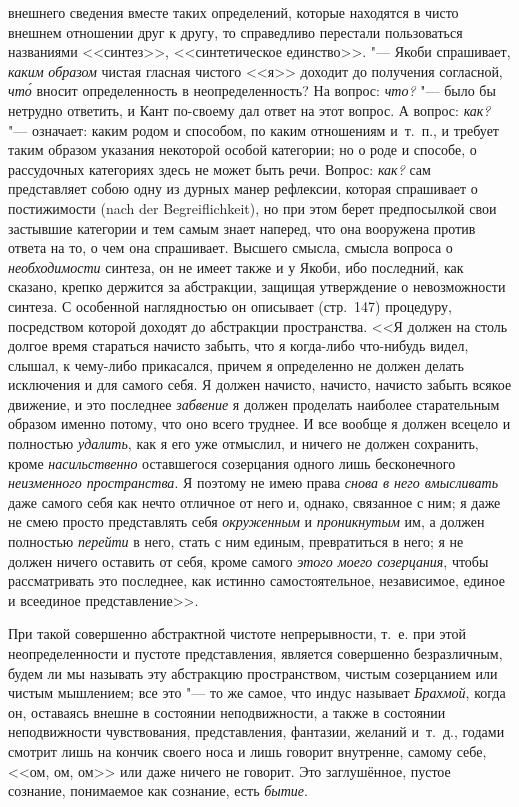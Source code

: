 внешнего сведения вместе таких определений, которые находятся в чисто
внешнем отношении друг к другу, то справедливо перестали пользоваться
названиями <<синтез>>, <<синтетическое единство>>. "--- Якоби спрашивает,
{\em каким} {\em образом} чистая
гласная чистого <<я>> доходит до получения согласной,
{\em чт\'{о}} вносит определенность в неопределенность? На
вопрос: {\em что?} "--- было бы нетрудно ответить, и Кант
по-своему дал ответ на этот вопрос. А вопрос:
{\em как?} "--- означает: каким родом и способом, по каким
отношениям и~т.~п., и требует таким образом указания некоторой особой
категории; но о роде и способе, о рассудочных категориях здесь не может
быть речи. Вопрос: {\em как?} сам представляет собою
одну из дурных манер рефлексии, которая спрашивает о постижимости (nach der
Begreiflichkeit), но при этом берет предпосылкой свои застывшие категории и
тем самым знает наперед, что она вооружена против ответа на то, о чем она
спрашивает. Высшего смысла, смысла вопроса о
{\em необходимости} синтеза, он не имеет также и у
Якоби, ибо последний, как сказано, крепко держится за абстракции, защищая
утверждение о невозможности синтеза. С особенной наглядностью он описывает
(стр.~147) процедуру, посредством которой доходят до абстракции
пространства. <<Я должен на столь долгое время стараться начисто забыть, что
я когда-либо что-нибудь видел, слышал, к чему-либо прикасался, причем я
определенно не должен делать исключения и для самого себя. Я должен
начисто, начисто, начисто забыть всякое движение, и это последнее
{\em забвение} я должен проделать наиболее старательным
образом именно потому, что оно всего труднее. И все вообще я должен всецело
и полностью {\em удалить}, как я его уже отмыслил, и
ничего не должен сохранить, кроме {\em насильственно}
оставшегося созерцания одного лишь бесконечного
{\em неизменного пространства}. Я поэтому не имею права
{\em снова в него вмысливать} даже самого себя как
нечто отличное от него и, однако, связанное с ним; я даже не смею просто
представлять себя {\em окруженным} и
{\em проникнутым} им, а должен полностью
{\em перейти} в него, стать с ним единым, превратиться
в него; я не должен ничего оставить от себя, кроме самого
{\em этого моего созерцания}, чтобы рассматривать это
последнее, как истинно самостоятельное, независимое, единое и всеединое
представление>>.

При такой совершенно абстрактной чистоте непрерывности, т.~е. при этой
неопределенности и пустоте представления, является совершенно безразличным,
будем ли мы называть эту абстракцию пространством, чистым созерцанием или
чистым мышлением; все это "--- то же самое, что индус называет
{\em Брахмой}, когда он, оставаясь внешне в состоянии
неподвижности, а также в состоянии неподвижности чувствования,
представления, фантазии, желаний и~т.~д., годами смотрит лишь на кончик
своего носа и лишь говорит внутренне, самому себе, <<ом, ом, ом>> или даже
ничего не говорит. Это заглушённое, пустое сознание, понимаемое как
сознание, есть {\em бытие}.

